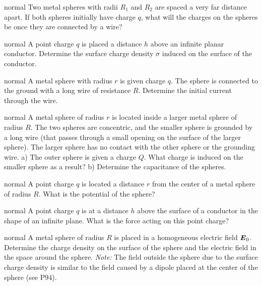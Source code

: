 \hypertarget{P98}{}
\begin{solution}{normal} %
Two metal spheres with radii $R_1$ and $R_2$ are spaced a very far distance apart. If both spheres initially have charge $q$, what will the charges on the spheres be once they are connected by a wire?
\end{solution}

\hypertarget{P99}{}
\begin{solution}{normal} %
A point charge $q$ is placed a distance $h$ above an infinite planar conductor. Determine the surface charge density $\sigma$ induced on the surface of the conductor.
\end{solution}

\hypertarget{P100}{}
\begin{solution}{normal} %
A metal sphere with radius $r$ is given charge $q$. The sphere is connected to the ground with a long wire of resistance $R$. Determine the initial current through the wire.
\end{solution}

\hypertarget{P101}{}
\begin{solution}{normal} %
A metal sphere of radius $r$ is located inside a larger metal sphere of radius $R$. The two spheres are concentric, and the smaller sphere is grounded by a long wire (that passes through a small opening on the surface of the larger sphere). The larger sphere has no contact with the other sphere or the grounding wire. a) The outer sphere is given a charge $Q$. What charge is induced on the smaller sphere as a result? b) Determine the capacitance of the spheres.
\end{solution}

\hypertarget{P102}{}
\begin{solution}{normal} %
A point charge $q$ is located a distance $r$ from the center of a metal sphere of radius $R$. What is the potential of the sphere?
\end{solution}

\hypertarget{P103}{}
\begin{solution}{normal} %
A point charge $q$ is at a distance $h$ above the surface of a conductor in the shape of an infinite plane. What is the force acting on this point charge?
\end{solution}

\hypertarget{P104}{}
\begin{solution}{normal} %
A metal sphere of radius $R$ is placed in a homogeneous electric field $\textbf{\textit{E}}_0$. Determine the charge density on the surface of the sphere and the electric field in the space around the sphere. \textit{Note:} The field outside the sphere due to the surface charge density is similar to the field caused by a dipole placed at the center of the sphere (see P94).
\end{solution}

